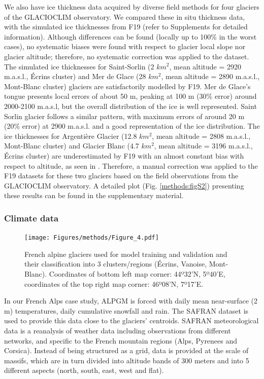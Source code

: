 We also have ice thickness data acquired by diverse field methods \citep[seismic, ground penetrating radar or hot water drilling,][]{rabatel_estimation_2018} for four glaciers of the GLACIOCLIM observatory. We compared these in situ thickness data, with the simulated ice thicknesses from F19 (refer to Supplements for detailed information). Although differences can be found (locally up to 100\% in the worst cases), no systematic biases were found with respect to glacier local slope nor glacier altitude; therefore, no systematic correction was applied to the dataset. The simulated ice thicknesses for Saint-Sorlin (2 \(km^2\), mean altitude = 2920 m.a.s.l., Écrins cluster) and Mer de Glace (28 \(km^2\), mean altitude = 2890 m.a.s.l., Mont-Blanc cluster) glaciers are  satisfactorily modelled by F19. Mer de Glace's tongue presents local errors of about 50 m, peaking at 100 m (30\% error) around 2000-2100 m.a.s.l, but the overall distribution of the ice is well represented. Saint Sorlin glacier follows a similar pattern, with maximum errors of around 20 m (20\% error) at 2900 m.a.s.l. and a good representation of the ice distribution. The ice thicknesses for Argentière Glacier (12.8 \(km^2\), mean altitude = 2808 m.a.s.l., Mont-Blanc cluster) and Glacier Blanc (4.7 \(km^2\), mean altitude = 3196 m.a.s.l., Écrins cluster) are underestimated by F19 with an almost constant bias with respect to altitude, as seen in \citet{rabatel_estimation_2018}. Therefore, a manual correction was applied to the F19 datasets for these two glaciers based on the field observations from the GLACIOCLIM observatory. A detailed plot (Fig. \ref{methods:figS2}) presenting these results can be found in the supplementary material.

\subsubsection{Climate data}

\begin{figure}
\centering
\texttt{[image: Figures/methods/Figure\_4.pdf]}
\caption{French alpine glaciers used for model training and validation and their classification into 3 clusters/regions (Écrins, Vanoise, Mont-Blanc). Coordinates of bottom left map corner: 44º32'N, 5º40'E, coordinates of the top right map corner: 46º08'N, 7º17'E.}
\label{methods:fig4}
\end{figure}


In our French Alps case study, ALPGM is forced with daily mean near-surface (2 m) temperatures, daily cumulative snowfall and rain. The SAFRAN dataset is used to provide this data close to the glaciers’ centroids. SAFRAN meteorological data \citep{durand_reanalysis_2009} is a reanalysis of weather data including observations from different networks, and specific to the French mountain regions (Alps, Pyrenees and Corsica). Instead of being structured as a grid, data is provided at the scale of massifs, which are in turn divided into altitude bands of 300 meters and into 5 different aspects (north, south, east, west and flat). 

